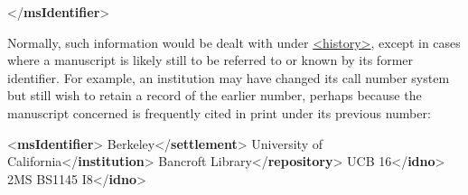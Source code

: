 \begin{shaded}
\mbox{}\newline 
{</\textbf{msIdentifier}>}\end{shaded}\egroup\par \noindent  Normally, such information would be dealt with under \hyperref[TEI.history]{<history>}, except in cases where a manuscript is likely still to be referred to or known by its former identifier. For example, an institution may have changed its call number system but still wish to retain a record of the earlier number, perhaps because the manuscript concerned is frequently cited in print under its previous number: \par\bgroup{}\exampleFont \begin{shaded}\noindent\mbox{}{<\textbf{msIdentifier}>}\mbox{}\newline 
{}Berkeley{</\textbf{settlement}>}\mbox{}\newline 
{}University of California{</\textbf{institution}>}\mbox{}\newline 
{}Bancroft Library{</\textbf{repository}>}\mbox{}\newline 
{}UCB 16{</\textbf{idno}>}\mbox{}\newline 
{}\mbox{}\newline 
\hspace*{1em}2MS BS1145 I8{</\textbf{idno}>}\mbox{}\newline 
{}\mbox{}\newline 

\end{shaded}
